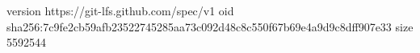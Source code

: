 version https://git-lfs.github.com/spec/v1
oid sha256:7c9fe2cb59afb23522745285aa73c092d48c8c550f67b69e4a9d9c8dff907e33
size 5592544
